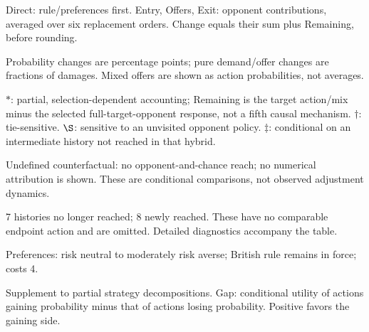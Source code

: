 \documentclass[10pt]{article}
\begin{document}
{\footnotesize Direct: rule/preferences first. Entry, Offers, Exit: opponent contributions, averaged over six replacement orders. Change equals their sum plus Remaining, before rounding.\par
Probability changes are percentage points; pure demand/offer changes are fractions of damages. Mixed offers are shown as action probabilities, not averages.\par
$*$: partial, selection-dependent accounting; Remaining is the target action/mix minus the selected full-target-opponent response, not a fifth causal mechanism. $\dagger$: tie-sensitive. $\S$: sensitive to an unvisited opponent policy. $\ddagger$: conditional on an intermediate history not reached in that hybrid.\par
Undefined counterfactual: no opponent-and-chance reach; no numerical attribution is shown. These are conditional comparisons, not observed adjustment dynamics.\par
7 histories no longer reached; 8 newly reached. These have no comparable endpoint action and are omitted. Detailed diagnostics accompany the table.}\par
{}\par
Preferences: risk neutral to moderately risk averse; British rule remains in force; costs 4.\par
{\small Supplement to partial strategy decompositions. Gap: conditional utility of actions gaining probability minus that of actions losing probability. Positive favors the gaining side.}\par
\end{document}
